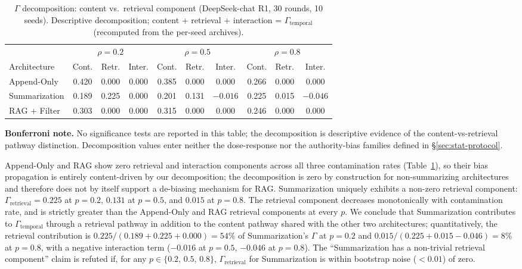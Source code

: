 \documentclass[11pt]{article}
\begin{document}
\begin{table}[htbp]
\centering
\caption{$\Gamma$ decomposition: content vs.\ retrieval component (DeepSeek-chat R1, 30 rounds, 10 seeds). Descriptive decomposition; content + retrieval + interaction = $\Gamma_{\text{temporal}}$ (recomputed from the per-seed archives).}
\label{tab:decomposition}
\begin{tabular}{lccccccccc}
\toprule
 & \multicolumn{3}{c}{$\rho=0.2$} & \multicolumn{3}{c}{$\rho=0.5$} & \multicolumn{3}{c}{$\rho=0.8$} \\
\cmidrule(lr){2-4} \cmidrule(lr){5-7} \cmidrule(lr){8-10}
Architecture & Cont. & Retr. & Inter. & Cont. & Retr. & Inter. & Cont. & Retr. & Inter. \\
\midrule
Append-Only        & 0.420 & 0.000 & 0.000 & 0.385 & 0.000 & 0.000 & 0.266 & 0.000 & 0.000 \\
Summarization      & 0.189 & 0.225 & 0.000 & 0.201 & 0.131 & $-0.016$ & 0.225 & 0.015 & $-0.046$ \\
RAG + Filter       & 0.303 & 0.000 & 0.000 & 0.315 & 0.000 & 0.000 & 0.246 & 0.000 & 0.000 \\ \bottomrule
\end{tabular}
\par\smallskip
{\small\textbf{Bonferroni note.} No significance tests are reported in this table; the decomposition is descriptive evidence of the content-vs-retrieval pathway distinction. Decomposition values enter neither the dose-response nor the authority-bias families defined in \S\ref{sec:stat-protocol}.}
\end{table}

Append-Only and RAG show zero retrieval and interaction components across all three contamination rates (Table~\ref{tab:decomposition}), so their bias propagation is entirely content-driven by our decomposition; the decomposition is zero by construction for non-summarizing architectures and therefore does not by itself support a de-biasing mechanism for RAG. Summarization uniquely exhibits a non-zero retrieval component: $\Gamma_{\text{retrieval}} = 0.225$ at $p=0.2$, $0.131$ at $p=0.5$, and $0.015$ at $p=0.8$. The retrieval component decreases monotonically with contamination rate, and is strictly greater than the Append-Only and RAG retrieval components at every $p$. We conclude that Summarization contributes to $\Gamma_{\text{temporal}}$ through a retrieval pathway in addition to the content pathway shared with the other two architectures; quantitatively, the retrieval contribution is $0.225/(0.189+0.225+0.000)=54\%$ of Summarization's $\Gamma$ at $p=0.2$ and $0.015/(0.225+0.015-0.046)=8\%$ at $p=0.8$, with a negative interaction term ($-0.016$ at $p{=}0.5$, $-0.046$ at $p{=}0.8$). The ``Summarization has a non-trivial retrieval component'' claim is refuted if, for any $p \in \{0.2,\,0.5,\,0.8\}$, $\Gamma_{\text{retrieval}}$ for Summarization is within bootstrap noise ($< 0.01$) of zero.
\end{document}
